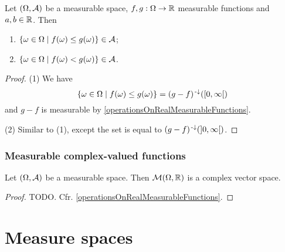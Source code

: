 \begin{proposition} \label{measurablesSetsDerivedFromRealMeasurableFunctions}
Let $\left( \Omega, \mathcal{A} \right)$ be a measurable space, $f,g: \Omega \to \mathbb{R}$ measurable functions and $a,b\in \mathbb{R}$. Then
\begin{enumerate}
\item $\left\{ \omega\in\Omega \;\middle|\; f(\omega) \leq g(\omega) \right\} \in \mathcal{A}$;
\item $\left\{ \omega\in\Omega \;\middle|\; f(\omega) < g(\omega) \right\} \in \mathcal{A}$.
\end{enumerate}
\end{proposition}
\begin{proof}
(1) We have
\[\setbuilder{\omega\in\Omega}{f(\omega) \leq g(\omega)} = (g-f)^{\preimf}(\interval[co]{0,\infty})\]
and $g-f$ is measurable by \ref{operationsOnRealMeasurableFunctions}.

(2) Similar to (1), except the set is equal to $(g-f)^{\preimf}(\interval[o]{0,\infty})$.
\end{proof}

\subsubsection{Measurable complex-valued functions}
\begin{proposition}
Let $\left( \Omega,\mathcal{A} \right)$ be a measurable space. Then $\operatorname{\mathcal{M}}(\Omega, \mathbb{R})$ is a complex vector space.
\end{proposition}
\begin{proof}
TODO. Cfr. \ref{operationsOnRealMeasurableFunctions}.
\end{proof}

\section{Measure spaces}
